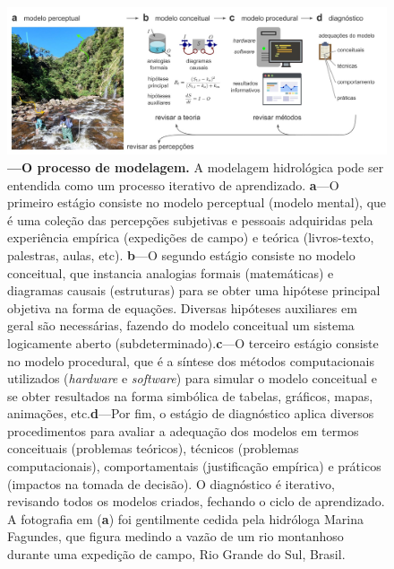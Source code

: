 \documentclass[./main.tex]{subfiles}
\begin{document}
\begin{figure}[t!] %
	\centering				
	\includegraphics[width=0.95\linewidth]{figs/fig_modelprocess.jpg}		
	\caption[O processo de modelagem]
	{\textbf{---\;O processo de modelagem.}
        A modelagem hidrológica pode ser entendida como um processo iterativo de aprendizado. \;\textbf{a}\;---\;O primeiro estágio consiste no modelo perceptual (modelo mental), que é uma coleção das percepções subjetivas e pessoais adquiridas pela experiência empírica (expedições de campo) e teórica (livros-texto, palestras, aulas, etc). \;\textbf{b}\;---\;O segundo estágio consiste no modelo conceitual, que instancia analogias formais (matemáticas) e diagramas causais (estruturas) para se obter uma hipótese principal objetiva na forma de equações. Diversas hipóteses auxiliares em geral são necessárias, fazendo do modelo conceitual um sistema logicamente aberto (subdeterminado).\;\textbf{c}\;---\;O terceiro estágio consiste no modelo procedural, que é a síntese dos métodos computacionais utilizados (\textit{hardware} e \textit{software}) para simular o modelo conceitual e se obter resultados na forma simbólica de tabelas, gráficos, mapas, animações, etc.\;\textbf{d}\;---\;Por fim, o estágio de diagnóstico aplica diversos procedimentos para avaliar a adequação dos modelos em termos conceituais (problemas teóricos), técnicos (problemas computacionais), comportamentais (justificação empírica) e práticos (impactos na tomada de decisão). O diagnóstico é iterativo, revisando todos os modelos criados, fechando o ciclo de aprendizado. A fotografia em (\textbf{a}) foi gentilmente cedida pela hidróloga Marina Fagundes, que figura medindo a vazão de um rio montanhoso durante uma expedição de campo, Rio Grande do Sul, Brasil.\;
	}
\label{fig:sys:process}  %
\end{figure}
\end{document}
